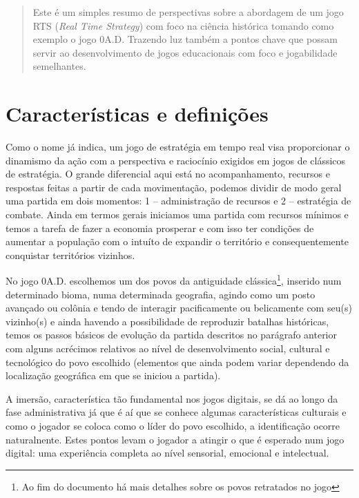 \documentclass[article,11pt, a4paper,sumario=tradicional]{abntex2}
\begin{document}
\maketitle

\textual

\begin{abstract}
    Este é um simples resumo de perspectivas sobre a abordagem de um jogo RTS (\textit{Real Time Strategy}) com foco na ciência histórica tomando como exemplo o jogo 0A.D. Trazendo luz também a pontos chave que possam servir ao desenvolvimento de jogos educacionais com foco e jogabilidade semelhantes.
\end{abstract}

\section{Características e definições}
    Como o nome já indica, um jogo de estratégia em tempo real visa proporcionar o dinamismo da ação com a perspectiva e raciocínio exigidos em jogos de clássicos de estratégia. O grande diferencial aqui está no acompanhamento, recursos e respostas feitas a partir de cada movimentação, podemos dividir de modo geral uma partida em dois momentos: 1 -- administração de recursos e 2 -- estratégia de combate. Ainda em termos gerais iniciamos uma partida com recursos mínimos e temos a tarefa de fazer a economia prosperar e com isso ter condições de aumentar a população com o intuíto de expandir o território e consequentemente conquistar territórios vizinhos.

    No jogo 0A.D. escolhemos um dos povos da antiguidade clássica\footnote{Ao fim do documento há mais detalhes sobre os povos retratados no jogo}, inserido num determinado bioma, numa determinada geografia, agindo como um posto avançado ou colônia e tendo de interagir pacificamente ou belicamente com seu(s) vizinho(s) e ainda havendo a possibilidade de reproduzir batalhas históricas, temos os passos básicos de evolução da partida descritos no parágrafo anterior com alguns acrécimos relativos ao nível de desenvolvimento social, cultural e tecnológico do povo escolhido (elementos que ainda podem variar dependendo da localização geográfica em que se iniciou a partida).

    A imersão, característica tão fundamental nos jogos digitais, se dá ao longo da fase administrativa já que é aí que se conhece algumas características culturais e como o jogador se coloca como o líder do povo escolhido, a identificação ocorre naturalnente. Estes pontos levam o jogador a atingir o que é esperado num jogo digital: uma experiência completa ao nível sensorial, emocional e intelectual.
\end{document}
